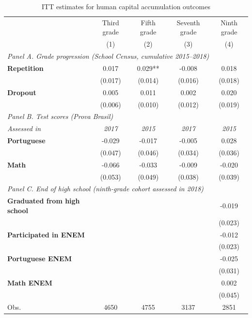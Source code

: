 \begin{table}[ht]
\centering
\begin{threeparttable}
\fontsize{9}{10}\selectfont
\caption{ITT estimates for human capital accumulation outcomes}\label{tab:long-lasting}
\begin{tabular*}{\textwidth}{@{\extracolsep{\fill}}l cccc}
\toprule
 & Third grade & Fifth grade & Seventh grade & Ninth grade \\
 & (1) & (2) & (3) & (4) \\
\midrule
\multicolumn{5}{l}{\textit{Panel A. Grade progression (School Census, cumulative 2015--2018)}} \\
{\bf Repetition} & 0.017 & 0.029** & -0.008 & 0.018 \\
  & (0.017) & (0.014) & (0.016) & (0.018) \\
{\bf Dropout} & 0.005 & 0.011 & 0.002 & 0.020 \\
  & (0.006) & (0.010) & (0.012) & (0.019) \\
\midrule
\multicolumn{5}{l}{\textit{Panel B. Test scores (\textit{Prova Brasil})}} \\
\textit{Assessed in} & \textit{2017} & \textit{2015} & \textit{2017} & \textit{2015} \\
{\bf Portuguese} & -0.029 & -0.017 & -0.005 & 0.028 \\
  & (0.047) & (0.046) & (0.034) & (0.036) \\
{\bf Math} & -0.066 & -0.033 & -0.009 & -0.020 \\
  & (0.053) & (0.049) & (0.038) & (0.039) \\
\midrule
\multicolumn{5}{l}{\textit{Panel C. End of high school (ninth-grade cohort assessed in 2018)}} \\
{\bf Graduated from high school} &  &  &  & -0.019 \\
  &  &  &  & (0.023) \\
{\bf Participated in ENEM} &  &  &  & -0.012 \\
  &  &  &  & (0.023) \\
{\bf Portuguese ENEM} &  &  &  & -0.025 \\
  &  &  &  & (0.031) \\
{\bf Math ENEM} &  &  &  & 0.002 \\
  &  &  &  & (0.045) \\
\midrule
Obs. & 4650 & 4755 & 3137 & 2851 \\
\bottomrule
\end{tabular*}
\begin{tablenotes}
\fontsize{9}{9}\selectfont

\end{tablenotes}
\end{threeparttable}
\end{table}
